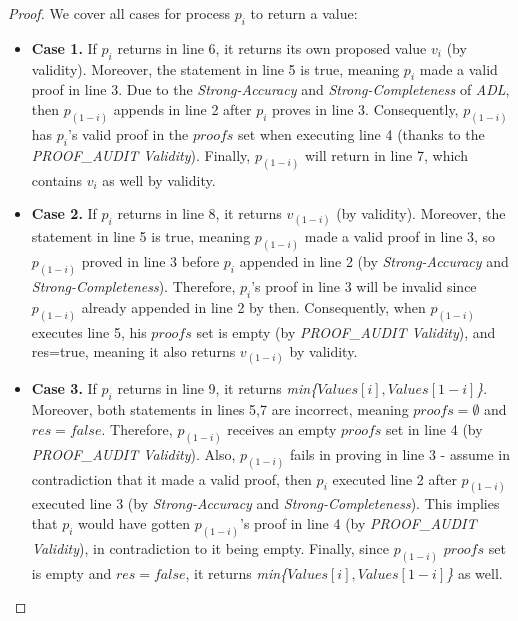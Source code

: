 \documentclass[11pt]{article}
\theoremstyle{definition}
\begin{document}
\begin{proof}
We cover all cases for process $p_i$ to return a value:

\begin{itemize}
    \item \textbf{Case 1.} If $p_i$ returns in line 6, it returns its own proposed value $v_i$ (by validity). Moreover, the statement in line 5 is true, meaning $p_i$ made a valid proof in line 3. Due to the \textit{Strong-Accuracy} and \textit{Strong-Completeness} of \textit{ADL}, then $p_{(1-i)}$ appends in line 2 after $p_i$ proves in line 3. Consequently, $p_{(1-i)}$ has $p_i$'s valid proof in the $proofs$ set when executing line 4 (thanks to the \textit{PROOF\_AUDIT Validity}). Finally, $p_{(1-i)}$ will return in line 7, which contains $v_i$ as well by validity.
    
    \item \textbf{Case 2.} If $p_i$ returns in line 8, it returns $v_{(1-i)}$ (by validity). Moreover, the statement in line 5 is true, meaning $p_{(1-i)}$ made a valid proof in line 3, so $p_{(1-i)}$ proved in line 3 before $p_i$ appended in line 2 (by \textit{Strong-Accuracy} and \textit{Strong-Completeness}). Therefore, $p_i$'s proof in line 3 will be invalid since $p_{(1-i)}$ already appended in line 2 by then. Consequently, when $p_{(1-i)}$ executes line 5, his ${proofs}$ set is empty (by \textit{PROOF\_AUDIT Validity}), and {res=true}, meaning it also returns $v_{(1-i)}$ by validity.

    \item \textbf{Case 3.} If $p_i$ returns in line 9, it returns \textit{min\{$Values[i],Values[1-i]$\}}. Moreover, both statements in lines 5,7 are incorrect, meaning $proofs=\emptyset$ and $res=false$. Therefore, $p_{(1-i)}$ receives an empty $proofs$ set in line 4 (by \textit{PROOF\_AUDIT Validity}). Also, $p_{(1-i)}$ fails in proving in line 3 - assume in contradiction that it made a valid proof, then $p_i$ executed line 2 after $p_{(1-i)}$ executed line 3 (by \textit{Strong-Accuracy} and \textit{Strong-Completeness}). This implies that $p_i$ would have gotten $p_{(1-i)}$'s proof in line 4 (by \textit{PROOF\_AUDIT Validity}), in contradiction to it being empty. Finally, since  $p_{(1-i)}$ $proofs$ set is empty and $res=false$, it returns \textit{min\{$Values[i],Values[1-i]$\}} as well.

\end{itemize}

\end{proof}
\end{document}
